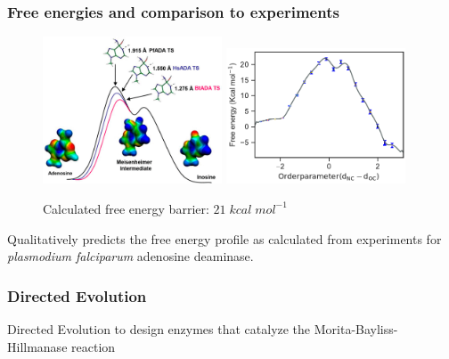 \documentclass{beamer}
\begin{document}
\begin{frame}
\frametitle{Free energies and comparison to experiments}
\begin{figure}
   \includegraphics[width=0.475\textwidth]{figures/ada-exp.png}
   \hfill
   \includegraphics[width=0.475\textwidth]{figures/ada-fenergy.pdf}
\caption{Calculated free energy barrier: $21\;kcal\;mol^{-1}$}
\end{figure}
Qualitatively predicts the free energy profile as calculated from experiments for \textit{plasmodium falciparum}
adenosine deaminase.
\end{frame}
\begin{frame}
\frametitle{Directed Evolution}
Directed Evolution to design enzymes that catalyze the Morita-Bayliss-Hillmanase reaction
\end{frame}
\end{document}
